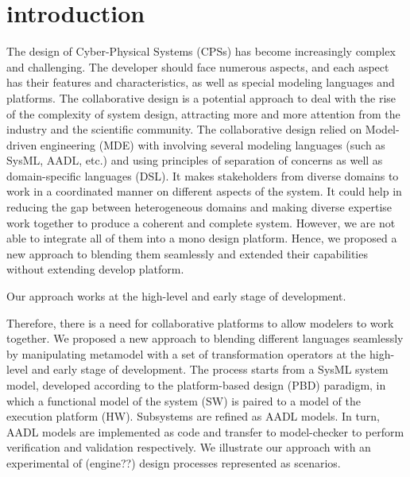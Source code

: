 \section{introduction}
The design of Cyber-Physical Systems (CPSs) has become increasingly complex and challenging. %
The developer should face numerous aspects, and each aspect has their features and characteristics, as well as special modeling languages and platforms. The collaborative design is a potential approach to deal with the rise of the complexity of system design, attracting more and more attention from the industry and the scientific community. The collaborative design relied on Model-driven engineering (MDE) with involving several modeling languages (such as SysML, AADL, etc.) and using principles of separation of concerns as well as domain-specific languages (DSL). It makes stakeholders from diverse domains to work in a coordinated manner on different aspects of the system. It could help in reducing the gap between heterogeneous domains and making diverse expertise work together to produce a coherent and complete system. However, we are not able to integrate all of them into a mono design platform. Hence, we proposed a new approach to blending them seamlessly and extended their capabilities without extending develop platform. 


Our approach works at the high-level and early stage of development. 


Therefore, there is a need for collaborative platforms to allow modelers to work together. We proposed a new approach to blending different languages seamlessly by manipulating metamodel with a set of transformation operators at the high-level and early stage of development. The process starts from a SysML system model, developed according to the platform-based design (PBD) paradigm, in which a functional model of the system (SW) is paired to a model of the execution platform (HW). Subsystems are refined as AADL models. In turn, AADL models are implemented as code and transfer to model-checker to perform verification and validation respectively. We illustrate our approach with an experimental of (engine??) design processes represented as scenarios.





